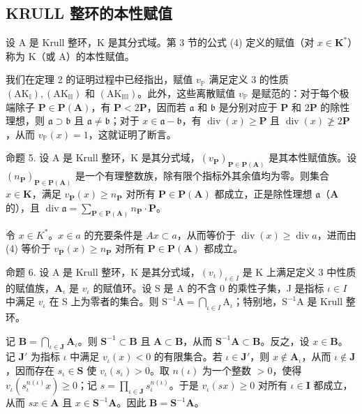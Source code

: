 \subsection{KRULL 整环的本性赋值}

设 A 是 Krull 整环，K 是其分式域。第 3 节的公式 (4) 定义的赋值（对 \(x \in \mathbf{K}^*\)）称为 K（或 A）的本性赋值。

我们在定理 2 的证明过程中已经指出，赋值 \(v_{\mathbb{P}}\) 满足定义 3 的性质 \((\mathrm{AK}_{\mathbb{I}}), (\mathrm{AK}_{\mathbb{II}})\) 和 \((\mathrm{AK}_{\mathbb{III}})\)。此外，这些离散赋值 \(v_{\mathbb{P}}\) 是赋范的：对于每个极端除子 \(\mathbf{P} \in \mathbf{P}(\mathbf{A})\)，有 \(\mathbf{P} < 2\mathbf{P}\)，因而若 \(\mathfrak{a}\) 和 \(\mathfrak{b}\) 是分别对应于 \(\mathbf{P}\) 和 \(2\mathbf{P}\) 的除性理想，则 \(\mathfrak{a} \supset \mathfrak{b}\) 且 \(\mathfrak{a} \neq \mathfrak{b}\)；对于 \(x \in \mathfrak{a} - \mathfrak{b}\)，有 \(\operatorname{div}(x) \geqslant \mathbf{P}\) 且 \(\operatorname{div}(x) \not\geqslant 2\mathbf{P}\)，从而 \(v_{\mathbb{P}}(x) = 1\)，这就证明了断言。

命题 5. 设 A 是 Krull 整环，K 是其分式域，\((v_{\mathbf{P}})_{\mathbf{P} \in \mathbf{P}(\mathbf{A})}\) 是其本性赋值族。设 \((n_{\mathbf{P}})_{\mathbf{P} \in \mathbf{P}(\mathbf{A})}\) 是一个有理整数族，除有限个指标外其余值均为零。则集合 \(x \in \mathbf{K}\)，满足 \(v_{\mathbf{P}}(x) \geqslant n_{\mathbf{P}}\) 对所有 \(\mathbf{P} \in \mathbf{P}(\mathbf{A})\) 都成立，正是除性理想 \(\mathfrak{a}\)（\(\mathbf{A}\) 的），且 \(\operatorname{div} \mathfrak{a} = \sum_{\mathbf{P} \in \mathbf{P}(\mathbf{A})} n_{\mathbf{P}} \cdot \mathbf{P}\)。

令 \(x \in K^*\)。\(x \in a\) 的充要条件是 \(Ax \subset a\)，从而等价于 \(\operatorname{div}(x) \geqslant \operatorname{div} a\)，进而由 (4) 等价于 \(v_{\mathbf{P}}(x) \geqslant n_{\mathbf{P}}\) 对所有 \(\mathbf{P} \in \mathbf{P}(\mathbf{A})\) 都成立。

命题 6. 设 A 是 Krull 整环，K 是其分式域，\((v_{\iota})_{\iota \in I}\) 是 K 上满足定义 3 中性质的赋值族，\(\mathbf{A}_{\iota}\) 是 \(v_{\iota}\) 的赋值环。设 S 是 A 的不含 0 的乘性子集，J 是指标 \(\iota \in I\) 中满足 \(v_{\iota}\) 在 S 上为零者的集合。则 \(\mathrm{S}^{-1}\mathrm{A} = \bigcap_{\iota \in I}\mathrm{A}_{\iota}\)；特别地，\(\mathrm{S}^{-1}\mathrm{A}\) 是 Krull 整环。

记 \(\mathbf{B} = \bigcap_{\iota \in \mathbf{J}} \mathbf{A}_{\iota}\)。则 \(\mathbf{S}^{-1} \subset \mathbf{B}\) 且 \(\mathbf{A} \subset \mathbf{B}\)，从而 \(\mathbf{S}^{-1}\mathbf{A} \subset \mathbf{B}\)。反之，设 \(x \in \mathbf{B}\)。记 \(\mathbf{J}'\) 为指标 \(\iota\) 中满足 \(v_{\iota}(x) < 0\) 的有限集合。若 \(\iota \in \mathbf{J}'\)，则 \(x \notin \mathbf{A}_{\iota}\)，从而 \(\iota \notin \mathbf{J}\)，因而存在 \(s_{\iota} \in \mathbf{S}\) 使 \(v_{\iota}(s_{\iota}) > 0\)。取 \(n(\iota)\) 为一个整数 \(>0\)，使得 \(v_{\iota}(s_{\iota}^{n(\iota)}x) \geqslant 0\)；记 \(s = \prod_{\iota \in \mathbf{J}} s_{\iota}^{n(\iota)}\)。于是 \(v_{\iota}(sx) \geqslant 0\) 对所有 \(\iota \in \mathbf{I}\) 都成立，从而 \(sx \in \mathbf{A}\) 且 \(x \in \mathbf{S}^{-1}\mathbf{A}\)。因此 \(\mathbf{B} = \mathbf{S}^{-1}\mathbf{A}\)。

